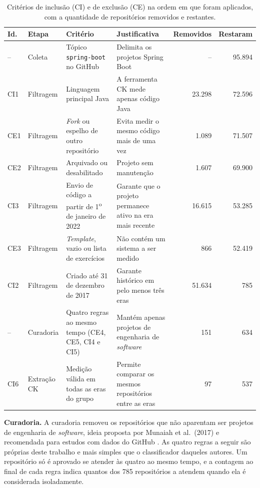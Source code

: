 \begin{table}[!t]
\centering\footnotesize
\caption{Critérios de inclusão (CI) e de exclusão (CE) na ordem em que foram aplicados, com a quantidade de repositórios removidos e restantes.}
\label{tab:criterios}
\begin{tabularx}{\linewidth}{llXXrr}
\hline
\textbf{Id.} & \textbf{Etapa} & \textbf{Critério} & \textbf{Justificativa} & \textbf{Removidos} & \textbf{Restaram} \\ \hline
-- & Coleta & Tópico \texttt{spring-boot} no GitHub & Delimita os projetos Spring Boot & -- & 95.894 \\
CI1 & Filtragem & Linguagem principal Java & A ferramenta CK mede apenas código Java & 23.298 & 72.596 \\
CE1 & Filtragem & \emph{Fork} ou espelho de outro repositório & Evita medir o mesmo código mais de uma vez & 1.089 & 71.507 \\
CE2 & Filtragem & Arquivado ou desabilitado & Projeto sem manutenção & 1.607 & 69.900 \\
CI3 & Filtragem & Envio de código a partir de 1\textsuperscript{o} de janeiro de 2022 & Garante que o projeto permanece ativo na era mais recente & 16.615 & 53.285 \\
CE3 & Filtragem & \emph{Template}, vazio ou lista de exercícios & Não contém um sistema a ser medido & 866 & 52.419 \\
CI2 & Filtragem & Criado até 31 de dezembro de 2017 & Garante histórico em pelo menos três eras & 51.634 & 785 \\
-- & Curadoria & Quatro regras ao mesmo tempo (CE4, CE5, CI4 e CI5) & Mantém apenas projetos de engenharia de \emph{software} & 151 & 634 \\
CI6 & Extração CK & Medição válida em todas as eras do grupo & Permite comparar os mesmos repositórios entre as eras & 97 & 537 \\
\hline
\end{tabularx}
\par\vspace{2pt}{\footnotesize Nota: na filtragem, cada repositório foi contado no primeiro critério que não atendeu, na ordem das linhas; na curadoria, as quatro regras são avaliadas ao mesmo tempo.}
\end{table}

\textbf{Curadoria.} A curadoria removeu os repositórios que não aparentam ser projetos de engenharia de \emph{software}, ideia proposta por Munaiah et al.\ (2017)\nocite{munaiah:17} e recomendada para estudos com dados do GitHub \cite{kalliamvakou:16}. As quatro regras a seguir são próprias deste trabalho e mais simples que o classificador daqueles autores. Um repositório só é aprovado se atender às quatro ao mesmo tempo, e a contagem ao final de cada regra indica quantos dos 785 repositórios a atendem quando ela é considerada isoladamente.

